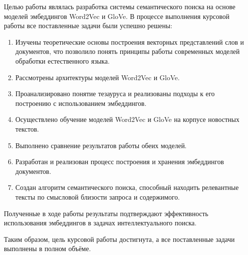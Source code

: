 \documentclass[coursework]{SCWorks}
\begin{document}
Целью работы являлась разработка системы семантического поиска на основе моделей эмбеддингов Word2Vec и GloVe. В процессе выполнения курсовой работы все поставленные задачи были успешно решены:
\begin{enumerate}
    \item Изучены теоретические основы построения векторных представлений слов и документов, что позволило понять принципы работы современных моделей обработки естественного языка.

    \item Рассмотрены архитектуры моделей Word2Vec  и GloVe.

    \item Проанализировано понятие тезауруса и реализованы подходы к его построению с использованием эмбеддингов.

    \item Осуществлено обучение моделей Word2Vec и GloVe на корпусе новостных текстов.

    \item Выполнено сравнение результатов работы обеих моделей.

    \item Разработан и реализован процесс построения и хранения эмбеддингов документов.

    \item Создан алгоритм семантического поиска, способный находить релевантные тексты по смысловой близости запроса и содержимого.
\end{enumerate}

Полученные в ходе работы результаты подтверждают эффективность использования эмбеддингов в задачах интеллектуального поиска.

Таким образом, цель курсовой работы достигнута, а все поставленные задачи выполнены в полном объёме.    


% 
% 

\appendix
\end{document}
